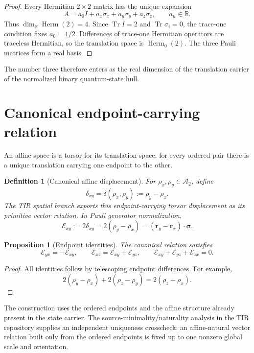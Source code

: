 \documentclass[12pt,a4paper]{article}
\newtheorem{proposition}[theorem]{Proposition}
\newtheorem{definition}[theorem]{Definition}
\newcommand{\Herm}{\operatorname{Herm}}
\newcommand{\Tr}{\operatorname{Tr}}
\newcommand{\R}{\mathbb{R}}
\newcommand{\Erel}{\mathcal{E}}
\newcommand{\Astate}{\mathcal{A}_2}
\newcommand{\sigmavec}{\bm{\sigma}}
\newcommand{\rvec}{\bm{r}}
\begin{document}
\begin{proof}
Every Hermitian $2\times2$ matrix has the unique expansion
\[
A=a_0I+a_x\sigma_x+a_y\sigma_y+a_z\sigma_z,
\qquad a_\mu\in\R.
\]
Thus $\dim_{\R}\Herm(2)=4$. Since $\Tr I=2$ and $\Tr\sigma_i=0$, the trace-one condition fixes $a_0=1/2$. Differences of trace-one Hermitian operators are traceless Hermitian, so the translation space is $\Herm_0(2)$. The three Pauli matrices form a real basis.
\end{proof}

The number three therefore enters as the real dimension of the translation carrier of the normalized binary quantum-state hull.

\section{Canonical endpoint-carrying relation}

An affine space is a torsor for its translation space: for every ordered pair there is a unique translation carrying one endpoint to the other.

\begin{definition}[Canonical affine displacement]
For $\rho_x,\rho_y\in\Astate$, define
\[
\boxed{
\delta_{xy}=\delta(\rho_x,\rho_y):=\rho_y-\rho_x.
}
\]
The TIR spatial branch exports this endpoint-carrying torsor displacement as its primitive vector relation. In Pauli generator normalization,
\[
\boxed{
\Erel_{xy}:=2\delta_{xy}=2(\rho_y-\rho_x)
=(\rvec_y-\rvec_x)\cdot\sigmavec.
}
\]
\end{definition}

\begin{proposition}[Endpoint identities]\label{prop:endpoint}
The canonical relation satisfies
\[
\boxed{
\Erel_{yx}=-\Erel_{xy},
\qquad
\Erel_{xz}=\Erel_{xy}+\Erel_{yz},
\qquad
\Erel_{xy}+\Erel_{yz}+\Erel_{zx}=0.
}
\]
\end{proposition}

\begin{proof}
All identities follow by telescoping endpoint differences. For example,
\[
2(\rho_y-\rho_x)+2(\rho_z-\rho_y)=2(\rho_z-\rho_x).
\]
\end{proof}

The construction uses the ordered endpoints and the affine structure already present in the state carrier. The source-minimality/naturality analysis in the TIR repository supplies an independent uniqueness crosscheck: an affine-natural vector relation built only from the ordered endpoints is fixed up to one nonzero global scale and orientation.
\end{document}
